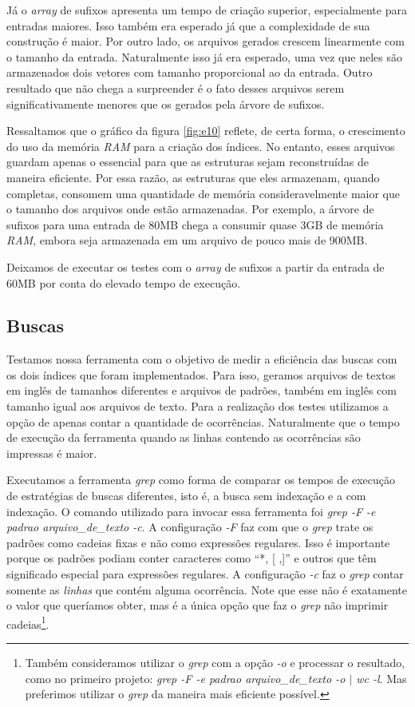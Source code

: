 \documentclass[]{article}
\newcommand{\figref}[1]{figura \ref{#1}}
\begin{document}
Já o \textit{array} de sufixos apresenta um tempo de criação superior, especialmente para entradas maiores. Isso também era esperado já que a complexidade de sua construção é maior. Por outro lado, os arquivos gerados crescem linearmente com o tamanho da entrada. Naturalmente isso já era esperado, uma vez que neles são armazenados dois vetores com tamanho proporcional ao da entrada. Outro resultado que não chega a surpreender é o fato desses arquivos serem significativamente menores que os gerados pela árvore de sufixos.


Ressaltamos que o gráfico da \figref{fig:e10} reflete, de certa forma, o crescimento do uso da memória \textit{RAM} para a criação dos índices. No entanto, esses arquivos guardam apenas o essencial para que as estruturas sejam reconstruídas de maneira eficiente. Por essa razão, as estruturas que eles armazenam, quando completas, consomem uma quantidade de memória consideravelmente maior que o tamanho dos arquivos onde estão armazenadas. Por exemplo, a árvore de sufixos para uma entrada de 80MB chega a consumir quase 3GB de memória \textit{RAM}, embora seja armazenada em um arquivo de pouco mais de 900MB.

Deixamos de executar os testes com o \textit{array} de sufixos a partir da entrada de 60MB por conta do elevado tempo de execução. 

\subsection{Buscas}

Testamos nossa ferramenta com o objetivo de medir a eficiência das buscas com os dois índices que foram implementados. Para isso, geramos arquivos de textos em inglês de tamanhos diferentes e arquivos de padrões, também em inglês com tamanho igual aos arquivos de texto. Para a realização dos testes utilizamos a opção de apenas contar a quantidade de ocorrências. Naturalmente que o tempo de execução da ferramenta quando as linhas contendo as ocorrências são impressas é maior.

Executamos a ferramenta \textit{grep} como forma de comparar os tempos de execução de estratégias de buscas diferentes, isto é, a busca sem indexação e a com indexação. O comando utilizado para invocar essa ferramenta foi \textit{grep -F -e padrao arquivo\_de\_texto -c}. A configuração \textit{-F} faz com que o \textit{grep} trate os padrões como cadeias fixas e não como expressões regulares. Isso é importante porque os padrões podiam conter caracteres como ``*, [ ,]'' e outros que têm significado especial para expressões regulares. A configuração \textit{-c} faz o \textit{grep} contar somente as \textit{linhas} que contém alguma ocorrência. Note que esse não é exatamente o valor que queríamos obter, mas é a única opção que faz o \textit{grep} não imprimir cadeias\footnote{Também consideramos utilizar o \textit{grep} com a opção \textit{-o} e processar o resultado, como no primeiro projeto: \textit{grep -F -e padrao arquivo\_de\_texto -o $\vert$ wc -l}. Mas preferimos utilizar o \textit{grep} da maneira mais eficiente possível.}.
\end{document}

